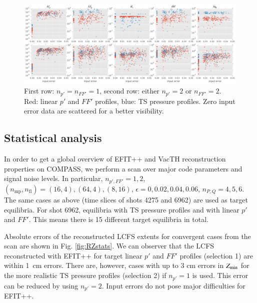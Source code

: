 \begin{figure}
\centering   %
\hfill{}
\includegraphics[width=18cm]{figures/kinetic_stats.pdf}
\hfill{}
\caption{First row: $n_{p'}=n_{FF'}=1$, second row: either $n_{p'}=2$ or $n_{FF'}=2$. Red: linear $p'$ and $FF'$ profiles, blue: TS pressure profiles. Zero input error data are scattered for a better visibility.}
\label{fig:kinetic_stats}
\end{figure}


\subsection{Statistical analysis} %
\label{sub:statistical_analysis}

In order to get a global overview of EFIT++ and VacTH reconstruction properties on COMPASS, we perform a scan over major code parameters and signal noise levels. In particular, $n_{p',FF'} = 1,2 $, $(n_\mathrm{mp}, n_\mathrm{fl}) = (16, 4), (64, 4), (8, 16)$, $\epsilon = 0, 0.02, 0.04, 0.06$, $n_{P,Q} = 4, 5, 6$. The same cases as above (time slices of shots 4275 and 6962) are used as target equilibria. For shot 6962, equilibria with TS pressure profiles and with linear $p'$ and $FF'$. This means there is 15 different target equilibria in total.

Absolute errors of the reconstructed LCFS extents for convergent cases from the scan are shown in Fig. \ref{fig:RZstats}. We can observer that the LCFS reconstructed with EFIT++ for target linear $p'$ and $FF'$ profiles (selection 1) are within 1~cm errors. There are, however, cases with up to 3 cm errors in $Z_{\rm{min}}$ for the more realistic TS pressure profiles (selection 2) if $n_{p'}=1$ is used. This error can be reduced by using $n_{p'}=2$. Input errors do not pose major difficulties for EFIT++. 

